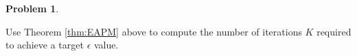 \documentclass[10pt]{exam}
\theoremstyle{definition}
\newtheorem{problem}{Problem}
\newcommand{\x}{\mathbf x}
\newcommand{\y}{\mathbf y}
\newcommand{\ltwo}[1]{{\lVert {#1} \rVert}_2}
\begin{document}
\begin{problem}
\begin{enumerate}
            Use Theorem \ref{thm:EAPM} above to compute the number of iterations $K$ required to achieve a target $\epsilon$ value.



\end{enumerate}
\end{problem}
\end{document}
